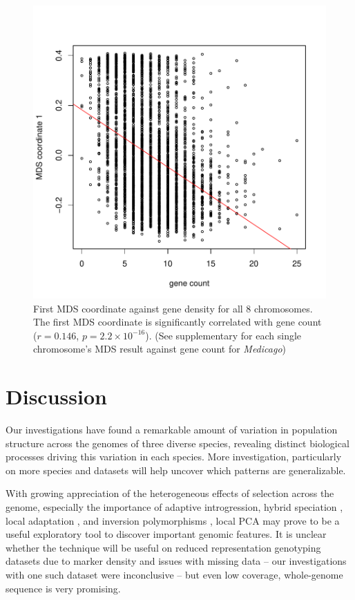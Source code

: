 \documentclass[11pt, oneside]{article}   	%
\begin{document}
\begin{figure}
    \begin{center}
       \includegraphics{MDS_1D_against_gene_count_all_chr_win104_with_lm}
    \end{center}
    \caption{
        First MDS coordinate against gene density for all 8 chromosomes. 
        The first MDS coordinate is significantly correlated with gene count ($r=0.146$, $p=2.2\times 10^{-16}$). 
        (See supplementary for each single chromosome's MDS result against gene count for \textit{Medicago})
        \label{fig:mds_gene_count}
    }
\end{figure}

\section{Discussion}

Our investigations have found a remarkable amount of variation in population structure across the genomes
of three diverse species,
revealing distinct biological processes driving this variation in each species.
More investigation, particularly on more species and datasets will help uncover which patterns are generalizable.

With growing appreciation of the heterogeneous effects of selection across the genome,
especially the importance of adaptive introgression, hybrid speciation \citep{pool2015natural,brandvain2014speciation,hufford2013genomic,fitzpatrick2010rapid,staubach2012genome},
local adaptation \citep{lenormand2002limits,wang2014isolation},
and inversion polymorphisms \citep{kirkpatrick2015chromosome,kirkpatrick2010chromosome},
local PCA may prove to be a useful exploratory tool to discover important genomic features.
It is unclear whether the technique will be useful on reduced representation genotyping datasets 
due to marker density and issues with missing data --
our investigations with one such dataset were inconclusive --
but even low coverage, whole-genome sequence is very promising.
\end{document}
